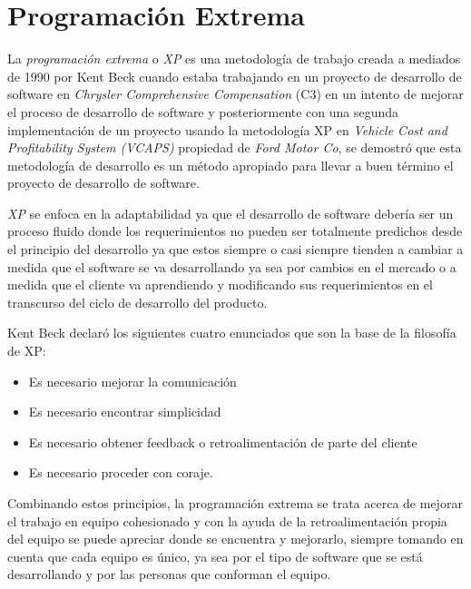 



   \section{Programación Extrema}
   \label{sec:xp}

     La \emph{programación extrema} o \emph{XP} es una metodología de trabajo creada a mediados de 1990 por Kent Beck cuando estaba trabajando en un proyecto de desarrollo de software en \emph{Chrysler Comprehensive Compensation} (C3) en un intento de mejorar el proceso de desarrollo de software y posteriormente con una segunda implementación de un proyecto usando la metodología XP en \emph{Vehicle Cost and Profitability System (VCAPS)} propiedad de \emph{Ford Motor Co}, se demostró que esta metodología de desarrollo es un método apropiado para llevar a buen término el proyecto de desarrollo de software. \cite{xp_site}

     \emph{XP} se enfoca en la adaptabilidad ya que el desarrollo de software debería ser un proceso fluido donde los requerimientos no pueden ser totalmente predichos desde el principio del desarrollo ya que estos siempre o casi siempre tienden a cambiar a medida que el software se va desarrollando ya sea por cambios en el mercado o a medida que el cliente va aprendiendo y modificando sus requerimientos en el transcurso del ciclo de desarrollo del producto.

     Kent Beck declaró los siguientes cuatro enunciados que son la base de la filosofía de XP:

     \begin{itemize}
       \item Es necesario mejorar la comunicación
       \item Es necesario encontrar simplicidad
       \item Es necesario obtener feedback o retroalimentación de parte del cliente
       \item Es necesario proceder con coraje.
     \end{itemize}

     Combinando estos principios, la programación extrema se trata acerca de mejorar el trabajo en equipo cohesionado y con la ayuda de la retroalimentación propia del equipo se puede apreciar donde se encuentra y mejorarlo, siempre tomando en cuenta que cada equipo es único, ya sea por el tipo de software que se está desarrollando y por las personas que conforman el equipo.

